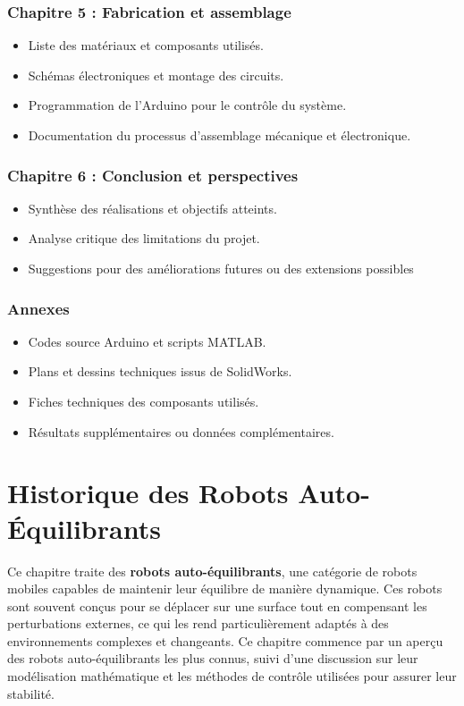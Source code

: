 \documentclass{report}
\begin{document}
\subsection*{Chapitre 5 : Fabrication et assemblage}
\begin{itemize}
    \item Liste des matériaux et composants utilisés.
    \item Schémas électroniques et montage des circuits.
    \item Programmation de l’Arduino pour le contrôle du système.
    \item Documentation du processus d’assemblage mécanique et électronique.
\end{itemize}

\subsection*{Chapitre 6 : Conclusion et perspectives}
\begin{itemize}
    \item Synthèse des réalisations et objectifs atteints.
    \item Analyse critique des limitations du projet.
    \item Suggestions pour des améliorations futures ou des extensions possibles 
\end{itemize}

\subsection*{Annexes}
\begin{itemize}
    \item Codes source Arduino et scripts MATLAB.
    \item Plans et dessins techniques issus de SolidWorks.
    \item Fiches techniques des composants utilisés.
    \item Résultats supplémentaires ou données complémentaires.
\end{itemize}



\chapter{Historique des Robots Auto-Équilibrants}



Ce chapitre traite des \textbf{robots auto-équilibrants}, une catégorie de robots mobiles capables de maintenir leur équilibre de manière dynamique. Ces robots sont souvent conçus pour se déplacer sur une surface tout en compensant les perturbations externes, ce qui les rend particulièrement adaptés à des environnements complexes et changeants. Ce chapitre commence par un aperçu des robots auto-équilibrants les plus connus, suivi d'une discussion sur leur modélisation mathématique et les méthodes de contrôle utilisées pour assurer leur stabilité.
\end{document}
